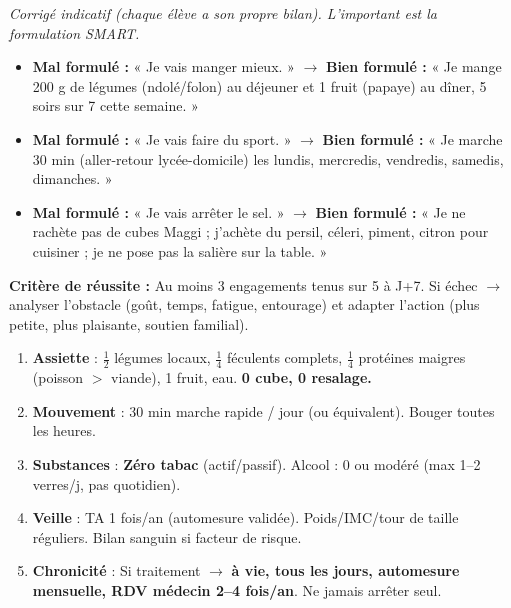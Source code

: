 \documentclass[11pt]{article}
\begin{document}
\begin{corrige}
\textit{Corrigé indicatif (chaque élève a son propre bilan). L'important est la formulation SMART.}
\begin{itemize}
\item \textbf{Mal formulé :} « Je vais manger mieux. » $\rightarrow$ \textbf{Bien formulé :} « Je mange 200 g de légumes (ndolé/folon) au déjeuner et 1 fruit (papaye) au dîner, 5 soirs sur 7 cette semaine. »
\item \textbf{Mal formulé :} « Je vais faire du sport. » $\rightarrow$ \textbf{Bien formulé :} « Je marche 30 min (aller-retour lycée-domicile) les lundis, mercredis, vendredis, samedis, dimanches. »
\item \textbf{Mal formulé :} « Je vais arrêter le sel. » $\rightarrow$ \textbf{Bien formulé :} « Je ne rachète pas de cubes Maggi ; j'achète du persil, céleri, piment, citron pour cuisiner ; je ne pose pas la salière sur la table. »
\end{itemize}
\textbf{Critère de réussite :} Au moins 3 engagements tenus sur 5 à J+7. Si échec $\rightarrow$ analyser l'obstacle (goût, temps, fatigue, entourage) et adapter l'action (plus petite, plus plaisante, soutien familial).
\end{corrige}

\begin{aretenir}
\begin{enumerate}
\item \textbf{Assiette} : $\frac{1}{2}$ légumes locaux, $\frac{1}{4}$ féculents complets, $\frac{1}{4}$ protéines maigres (poisson $>$ viande), 1 fruit, eau. \textbf{0 cube, 0 resalage.}
\item \textbf{Mouvement} : 30 min marche rapide / jour (ou équivalent). Bouger toutes les heures.
\item \textbf{Substances} : \textbf{Zéro tabac} (actif/passif). Alcool : 0 ou modéré (max 1--2 verres/j, pas quotidien).
\item \textbf{Veille} : TA 1 fois/an (automesure validée). Poids/IMC/tour de taille réguliers. Bilan sanguin si facteur de risque.
\item \textbf{Chronicité} : Si traitement $\rightarrow$ \textbf{à vie, tous les jours, automesure mensuelle, RDV médecin 2--4 fois/an}. Ne jamais arrêter seul.
\end{enumerate}
\end{aretenir}
\end{document}
